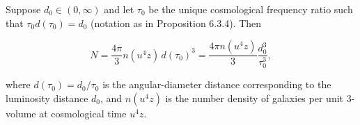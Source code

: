 Suppose $d_0 \in (0, \infty)$ and let $\tau_0$ be the unique cosmological frequency ratio such that $\tau_0 d(\tau_0) = d_0$ (notation as in Proposition 6.3.4). Then

$$N = \frac{4\pi}{3} n(u^4 z) \, d(\tau_0)^3 = \frac{4\pi n(u^4 z)}{3} \frac{d_0^3}{\tau_0^3},$$

where $d(\tau_0) = d_0 / \tau_0$ is the angular-diameter distance corresponding to the luminosity distance $d_0$, and $n(u^4 z)$ is the number density of galaxies per unit 3-volume at cosmological time $u^4 z$.
